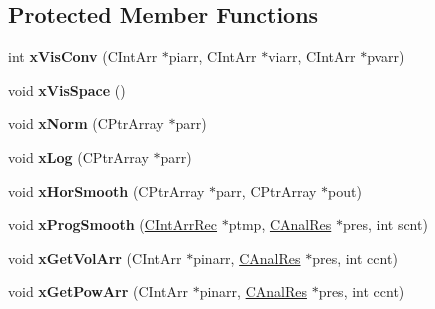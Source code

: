 \subsection*{Protected Member Functions}
\begin{DoxyCompactItemize}
\item 
\hypertarget{class_c_anal_proc_a1c1a92d60d132a63df2b97e852d0b9c1}{int {\bfseries x\-Vis\-Conv} (C\-Int\-Arr $\ast$piarr, C\-Int\-Arr $\ast$viarr, C\-Int\-Arr $\ast$pvarr)}\label{class_c_anal_proc_a1c1a92d60d132a63df2b97e852d0b9c1}

\item 
\hypertarget{class_c_anal_proc_a4a8dcf38da0c30918d3d8005fd5b2a50}{void {\bfseries x\-Vis\-Space} ()}\label{class_c_anal_proc_a4a8dcf38da0c30918d3d8005fd5b2a50}

\item 
\hypertarget{class_c_anal_proc_a1ab4acb5a10272be820be912b3a7f31c}{void {\bfseries x\-Norm} (C\-Ptr\-Array $\ast$parr)}\label{class_c_anal_proc_a1ab4acb5a10272be820be912b3a7f31c}

\item 
\hypertarget{class_c_anal_proc_a9b8b53d9a75e73806b3c86ec1cdb9c60}{void {\bfseries x\-Log} (C\-Ptr\-Array $\ast$parr)}\label{class_c_anal_proc_a9b8b53d9a75e73806b3c86ec1cdb9c60}

\item 
\hypertarget{class_c_anal_proc_aa5b0390da89e7c87890e35c404f31a8e}{void {\bfseries x\-Hor\-Smooth} (C\-Ptr\-Array $\ast$parr, C\-Ptr\-Array $\ast$pout)}\label{class_c_anal_proc_aa5b0390da89e7c87890e35c404f31a8e}

\item 
\hypertarget{class_c_anal_proc_a881bbda81bdea33a8666fb02fb35df4d}{void {\bfseries x\-Prog\-Smooth} (\hyperlink{class_c_int_arr_rec}{C\-Int\-Arr\-Rec} $\ast$ptmp, \hyperlink{class_c_anal_res}{C\-Anal\-Res} $\ast$pres, int scnt)}\label{class_c_anal_proc_a881bbda81bdea33a8666fb02fb35df4d}

\item 
\hypertarget{class_c_anal_proc_afbad28b0f949172e55c9655391b285c2}{void {\bfseries x\-Get\-Vol\-Arr} (C\-Int\-Arr $\ast$pinarr, \hyperlink{class_c_anal_res}{C\-Anal\-Res} $\ast$pres, int ccnt)}\label{class_c_anal_proc_afbad28b0f949172e55c9655391b285c2}

\item 
\hypertarget{class_c_anal_proc_a480d948f9e97318ad6b9a8b895f2b6b2}{void {\bfseries x\-Get\-Pow\-Arr} (C\-Int\-Arr $\ast$pinarr, \hyperlink{class_c_anal_res}{C\-Anal\-Res} $\ast$pres, int ccnt)}\label{class_c_anal_proc_a480d948f9e97318ad6b9a8b895f2b6b2}


\end{DoxyCompactItemize}

